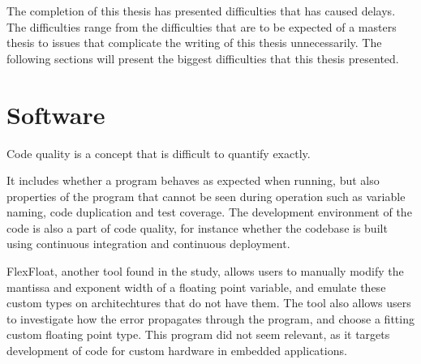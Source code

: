 
The completion of this thesis has presented difficulties that has caused delays. The difficulties range from the difficulties that are to be expected of a masters thesis to issues that complicate the writing of this thesis unnecessarily. The following sections will present the biggest difficulties that this thesis presented. 






\section{Software}
Code quality is a concept that is difficult to quantify exactly.

It includes whether a program behaves as expected when running, but also properties of the program that cannot be seen during operation such as variable naming, code duplication and test coverage.
The development environment of the code is also a part of code quality, for instance whether the codebase is built using
continuous integration and continuous deployment.



FlexFloat, another tool found in the study, allows users to manually modify the mantissa and exponent width of a floating point variable, and emulate these custom types on architechtures that do not have them. The tool also allows users to investigate how the error propagates through the program, and choose a fitting custom floating point type. This program did not seem relevant, as it targets development of code for custom hardware in embedded applications.

